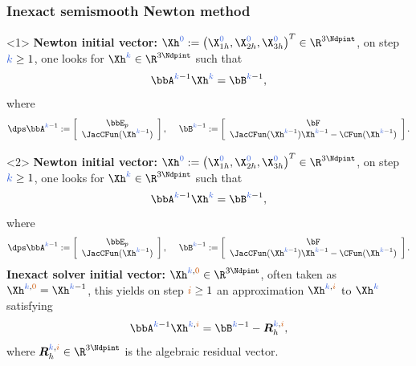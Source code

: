 \documentclass[aspectratio=169]{beamer}
\newcommand{\kk}{\textcolor{royalblue}{k}}
\newcommand{\ii}{\textcolor{burntorange}{i}}
\newcommand{\zzero}{\textcolor{royalblue}{0}}
\newcommand{\izzero}{\textcolor{burntorange}{0}}
\begin{document}
\begin{frame}
\frametitle{Inexact semismooth Newton method}
\begin{onlyenv}<1>
\textcolor{cadmiumgreen}{\textbf{Newton initial vector:}} $\Xh^{\zzero} \egaldef \left(\X_{1h}^{\zzero},\X_{2h}^{\zzero}, \X_{3h}^{\zzero} \right)^{T} \in \R^{3 \Ndpint}$, on step $\kk \geq 1$, one looks for $\Xh^{\kk} \in \R^{3 \Ndpint}$ such that
\begin{equation*}
\bbA^{\kk-1}\Xh^{\kk}=\bB^{\kk-1},
\end{equation*} 
where 
\begin{equation*}
\dps \bbA^{\kk-1}\egaldef
\left[\begin{array}{c}
\bbE_{p} \\
\JacCFun(\Xh^{\kk-1})
\end{array}
\right],
\quad  \hspace{0.1 cm} \bB^{\kk-1} \egaldef
\left[\begin{array}{c}
\bF\\
\JacCFun(\Xh^{\kk-1})\Xh^{\kk-1}-\CFun(\Xh^{\kk-1})
\end{array}
\right].
\end{equation*}
\end{onlyenv}
\begin{onlyenv}<2>
\textcolor{cadmiumgreen}{\textbf{Newton initial vector:}} $\Xh^{\zzero} \egaldef \left(\X_{1h}^{\zzero},\X_{2h}^{\zzero}, \X_{3h}^{\zzero} \right)^{T} \in \R^{3 \Ndpint}$, on step $\kk \geq 1$, one looks for $\Xh^{\kk} \in \R^{3 \Ndpint}$ such that
\begin{equation*}
\bbA^{\kk-1}\Xh^{\kk}=\bB^{\kk-1},
\end{equation*} 
where 
\begin{equation*}
\dps \bbA^{\kk-1}\egaldef
\left[\begin{array}{c}
\bbE_{p} \\
\JacCFun(\Xh^{\kk-1})
\end{array}
\right],
\quad  \hspace{0.1 cm} \bB^{\kk-1} \egaldef
\left[\begin{array}{c}
\bF\\
\JacCFun(\Xh^{\kk-1})\Xh^{\kk-1}-\CFun(\Xh^{\kk-1})
\end{array}
\right].
\end{equation*}
\textcolor{cadmiumgreen}{\textbf{Inexact solver initial vector:}}
$\Xh^{\kk,\izzero} \in \R^{3 \Ndpint}$, often taken as $\Xh^{\kk,\izzero} = \Xh^{\kk-1}$, this yields on step $\ii \geq
1$ an approximation $\Xh^{\kk,\ii}$ to $\Xh^{\kk}$ satisfying
\begin{equation*}
\bbA^{\kk-1}\Xh^{\kk,\ii} =\bB^{\kk-1}-{\bm R}_h^{\kk,\ii},
\end{equation*}
where ${\bm R}_h^{\kk,\ii} \in \R^{3 \Ndpint}$ is the algebraic residual vector.
\end{onlyenv}


\end{frame}
\end{document}
